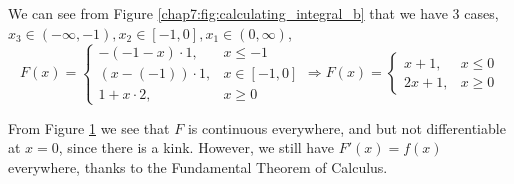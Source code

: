 {{\begin{figure}[H]
{
    \label{chap7:fig:Fx_final_b}
  }
  \caption{}
\end{figure}

We can see from Figure 
\ref{chap7:fig:calculating_integral_b}
that we have 3 cases, $x_3 \in (-\infty, -1), x_2 \in [-1, 0], x_1 \in (0, \infty)$,
\begin{equation*}
  F(x) = \begin{cases}
    -(-1-x) \cdot 1, &x \leq -1\\
    (x-(-1)) \cdot 1, &x \in [-1, 0]\\
    1 + x \cdot 2, &x \geq 0
  \end{cases} \Rightarrow
  F(x) = \begin{cases}
    x+1, &x \leq 0\\
    2x+1, &x \geq 0
  \end{cases}
\end{equation*}

From Figure 
\ref{chap7:fig:Fx_final_b}
we see that 
$F$ is continuous everywhere, and but not differentiable at $x=0$,
since there is a kink.
However, we still have $F'(x) = f(x)$ everywhere,
thanks to the Fundamental Theorem of Calculus.
}
}


